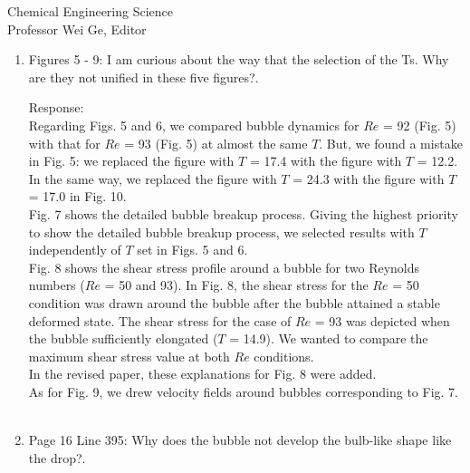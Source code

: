 \documentclass{letter}
\begin{document}
\begin{letter}{
Chemical Engineering Science\\
Professor Wei Ge, Editor\\}
\begin{enumerate}
Response: \\
We agree with the reviewer's suggestion. We added results at $T$ = 40.1, 50.0, and 56.7 to the drop case for $Re$ = 1.0 in Fig. 4.  As can be seen from the new Fig. 4, a drop remains a stable deformed state after $T$ = 35.0. In the revised paper, such a comment was added.\\
\\

\par\noindent
\item
\textsf
{Figures 5 - 9: I am curious about the way that the selection of the Ts. Why are they not unified in these five figures?.}
\vspace{3 mm}

Response: \\
Regarding Figs. 5 and 6, we compared bubble dynamics for $Re$ = 92 (Fig. 5) with that for $Re$ = 93 (Fig. 5) at almost the same $T$.
But, we found a mistake in Fig. 5: we replaced the figure with $T$ = 17.4 with the figure with $T$ = 12.2.
In the same way, we replaced the figure with $T$ = 24.3 with the figure with $T$ = 17.0 in Fig. 10. \\

Fig. 7 shows the detailed bubble breakup process. Giving the highest priority to show the detailed bubble breakup process, we selected 
results with $T$ independently of $T$ set in Figs. 5 and 6.\\

Fig. 8 shows the shear stress profile around a bubble for two Reynolds numbers ($Re$ = 50 and 93). In Fig. 8, the shear stress for the 
$Re$ = 50 condition was drawn around the bubble after the bubble attained a stable deformed state.
The shear stress for the case of $Re$ = 93 was depicted when the bubble sufficiently elongated ($T$ = 14.9).
We wanted to compare the maximum shear stress value at both $Re$ conditions. \\
In the revised paper, these explanations for Fig. 8 were added.\\

As for Fig. 9, we drew velocity fields around bubbles corresponding to Fig. 7.\\
\\

\par\noindent
\item
\textsf
{Page 16 Line 395: Why does the bubble not develop the bulb-like shape like the drop?.}
\vspace{3 mm}


\end{enumerate}
\end{letter}
\end{document}
